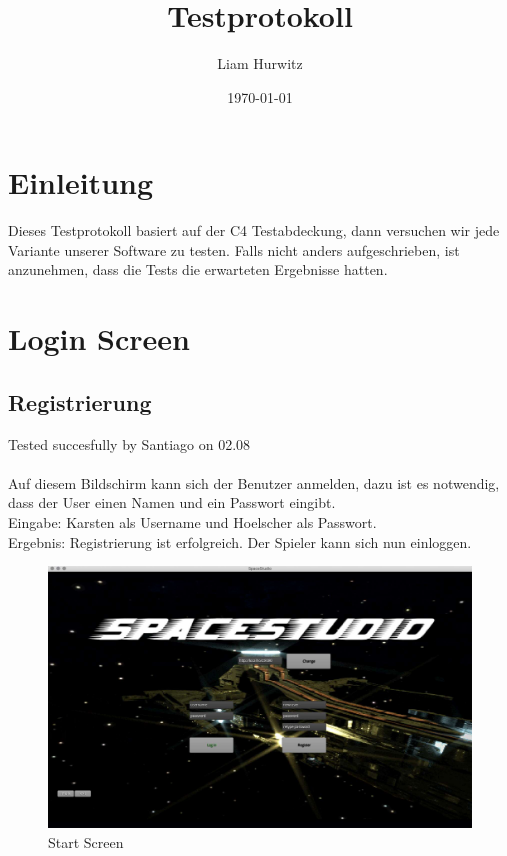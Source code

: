 \documentclass[12pt]{article}
\author{Liam Hurwitz}
\date{\today}
\title{Testprotokoll}
\begin{document}
\maketitle
\newpage
\tableofcontents

\newpage
\section{Einleitung}
Dieses Testprotokoll basiert auf der C4 Testabdeckung, dann versuchen wir jede Variante unserer Software zu testen. Falls nicht anders aufgeschrieben, ist anzunehmen, dass die Tests die erwarteten Ergebnisse hatten. 

\section{Login Screen}
\label{sec:orgc5dc561}
\subsection{Registrierung}
Tested succesfully by Santiago on 02.08\\\\
Auf diesem Bildschirm kann sich der Benutzer anmelden, dazu ist es notwendig, dass der User einen Namen und ein Passwort eingibt.\\
Eingabe: Karsten als Username und Hoelscher als Passwort.\\
Ergebnis: Registrierung ist erfolgreich. Der Spieler kann sich nun einloggen.\\
\begin{figure}[htp]
\centering
\includegraphics[scale=0.4]{TestProtocolBilder/startScreen.jpg}
\caption{Start Screen}
\end{figure}
\end{document}
